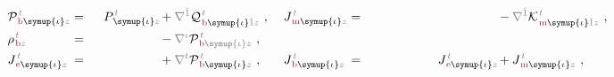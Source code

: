 \begin{subequations}
\begin{align}
	&{\mathcal{P}}^{\;\!\mathcolor{gray}{t}}_{\;\!\textcolor{Maroon}{\text{b}} \symup{\iota} \mathcolor{gray}{z}} \hspace{-1em}&&=\hspace{0.2em} \hphantom{+}~ P^{\;\!\mathcolor{gray}{t}}_{\;\! \symup{\iota}\mathcolor{gray}{z}} &&\hspace{-1.1em}+ \mathcolor{gray}{\nabla^{\hat{1}}} {\mathcal{Q}}^{\;\!\mathcolor{gray}{t}}_{\;\!\textcolor{Maroon}{\text{b}} \symup{\iota} \mathcolor{gray}{\hat{1}} \mathcolor{gray}{z}}~, &&\hspace{0.3em} {J}^{\;\!\mathcolor{gray}{t}}_{\;\!\textcolor{Maroon}{\text{m}} \symup{\iota} \mathcolor{gray}{z}} \hspace{-1em}&&=\hspace{0.2em} &&\hspace{-1.1em}- \mathcolor{gray}{\nabla^{\hat{1}}} {\mathcal{K}}^{\;\!\mathcolor{gray}{t}}_{\;\!\textcolor{Maroon}{\text{m}} \symup{\iota} \mathcolor{gray}{\hat{1}} \mathcolor{gray}{z}}~, \label{eq:Pb-Jm} \\
	&{\rho}^{\;\!\mathcolor{gray}{t}}_{\;\!\textcolor{Maroon}{\text{b}} \mathcolor{gray}{z}} \hspace{-1em}&&=\hspace{0.2em} &&\hspace{-1.1em}- \mathcolor{gray}{\nabla^\iota} {\mathcal{P}}^{\;\!\mathcolor{gray}{t}}_{\;\!\textcolor{Maroon}{\text{b}} \mathcolor{gray}{\symup{\iota}} \mathcolor{gray}{z}}~, &&\hspace{0.3em} \hspace{-1em}&& &&\hspace{-1.1em} \label{eq:pb} \\
	&{J}^{\;\!\mathcolor{gray}{t}}_{\;\!\textcolor{Maroon}{\text{e}} \symup{\iota} \mathcolor{gray}{z}} \hspace{-1em}&&=\hspace{0.2em} &&\hspace{-1.1em}+ \mathcolor{gray}{\nabla^t} {\mathcal{P}}^{\;\!\mathcolor{gray}{t}}_{\;\!\textcolor{Maroon}{\text{b}} \symup{\iota} \mathcolor{gray}{z}}~, &&\hspace{0.3em} {J}^{\;\!\mathcolor{gray}{t}}_{\;\!\textcolor{Maroon}{\text{b}} \symup{\iota} \mathcolor{gray}{z}} \hspace{-1em}&&=\hspace{0.2em} ~ \hphantom{- \epsilon^{\hphantom{\symup{\iota}\hat{1}}\hat{2}}_{\symup{\iota} \hat{1}}} {J}^{\;\!\mathcolor{gray}{t}}_{\;\!\textcolor{Maroon}{\text{e}} \symup{\iota} \mathcolor{gray}{z}} &&\hspace{-1.1em}+ {J}^{\;\!\mathcolor{gray}{t}}_{\;\!\textcolor{Maroon}{\text{m}} \symup{\iota} \mathcolor{gray}{z}}~, \label{eq:Je-Jb} \\

\end{align}
\end{subequations}
